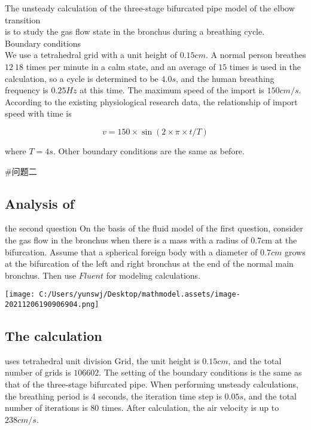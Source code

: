 \documentclass[
]{article}
\begin{document}
The unsteady calculation of the three-stage bifurcated pipe model of the
elbow transition \\
is to study the gas flow state in the bronchus during a breathing cycle.
\\
Boundary conditions\\
We use a tetrahedral grid with a unit height of \(0.15cm\). A normal
person breathes \(12~18\) times per minute in a calm state, and an
average of \(15\) times is used in the calculation, so a cycle is
determined to be \(4.0s\), and the human breathing frequency is
\(0.25Hz\) at this time. The maximum speed of the import is
\(150 cm/s\). According to the existing physiological research data, the
relationship of import speed with time is

\[v=150 \times \sin(2 \times \pi \times t/T)\]

where \(T=4 s\). Other boundary conditions are the same as before.

\#问题二

\hypertarget{analysis-of}{%
\subsection{\texorpdfstring{Analysis of
}{Analysis of }}\label{analysis-of}}

the second question On the basis of the fluid model of the first
question, consider the gas flow in the bronchus when there is a mass
with a radius of 0.7cm at the bifurcation. Assume that a spherical
foreign body with a diameter of \(0.7cm\) grows at the bifurcation of
the left and right bronchus at the end of the normal main bronchus. Then
use \(Fluent\) for modeling calculations.

\texttt{[image: C:/Users/yunswj/Desktop/mathmodel.assets/image-20211206190906904.png]}

\hypertarget{the-calculation}{%
\subsection{\texorpdfstring{The calculation
}{The calculation }}\label{the-calculation}}

uses tetrahedral unit division Grid, the unit height is \(0.15 cm\), and
the total number of grids is \(106602\). The setting of the boundary
conditions is the same as that of the three-stage bifurcated pipe. When
performing unsteady calculations, the breathing period is 4 seconds, the
iteration time step is \(0.05s\), and the total number of iterations is
\(80\) times. After calculation, the air velocity is up to \(238cm/s\).
\end{document}
